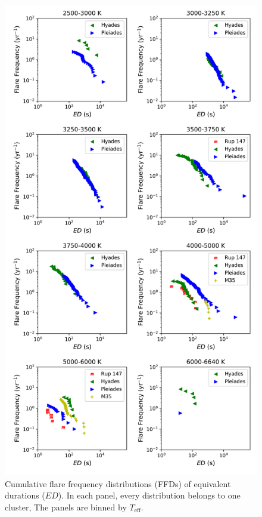 \documentclass{aa}
\begin{document}
     \begin{figure}
      \centering
            \includegraphics[width=13cm]{pics/FFDs/FFDs_Teff_aggregated_s_2019_03_22_15.png}
         \caption{Cumulative flare frequency distributions (FFDs) of equivalent durations ($ED$). In each panel, every distribution belongs to one cluster, The panels are binned by $T_\mathrm{eff}$.}
          \label{ffds_teff_s}
   \end{figure}
\end{document}
